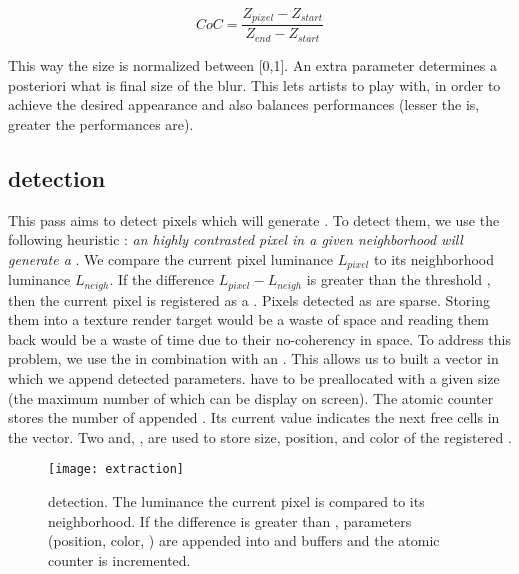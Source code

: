 $$
	CoC = \frac{Z_{pixel} - Z_{start} }{ Z_{end} - Z_{start} }
$$

This way the \coc size is normalized between [0,1]. An extra parameter  determines a posteriori what is final size of the blur. This lets artists to play with, in order to achieve the desired appearance and also balances performances (lesser the  is, greater the performances are).


\subsection{\Bokeh detection}
This pass aims to detect pixels which will generate \bokehs. To detect them, we use the following heuristic : \emph{an highly contrasted pixel in a given neighborhood will generate a \bokeh}. We compare the current pixel luminance $L_{pixel}$ to its neighborhood luminance $L_{neigh}$. If the difference $L_{pixel}-L_{neigh}$ is greater than the threshold , then the current pixel is registered as a \bokeh. Pixels detected as \bokeh are sparse. Storing them into a texture render target would be a waste of space and reading them back would be a waste of time due to their no-coherency in space. To address this problem, we use the \opengl {} in combination with an . This allows us to built a vector in which we append detected \bokehs parameters.  have to be preallocated with a given size (\ie the maximum number of \bokehs which can be display on screen). The atomic counter  stores the number of appended \bokehs. Its current value indicates the next free cells in the  vector. Two   and, , are used to store \coc size, position, and color of the registered \bokehs. 

	\begin{figure}[htb]\centering
	\texttt{[image: extraction]}
	\caption{\Bokeh detection. The luminance the current pixel is compared to its neighborhood. If the difference is greater than , \bokeh parameters (position, color, \coc) are appended into  and  buffers and the atomic counter  is incremented.}
	\label{DeRousiers:detection}
	\end{figure}

